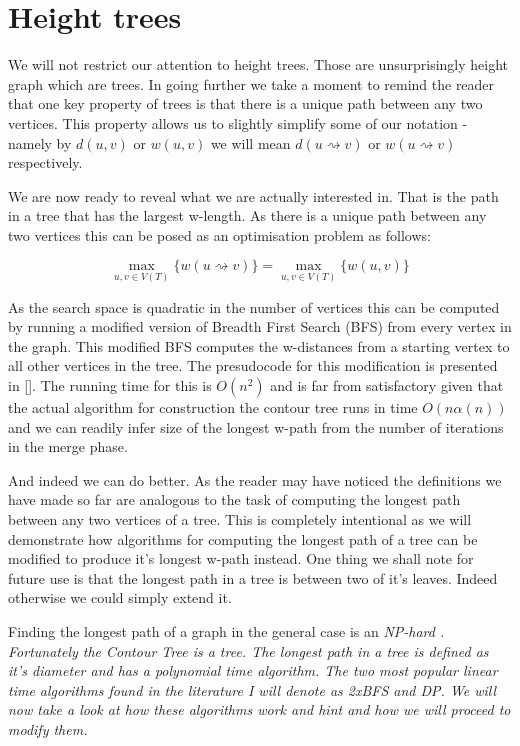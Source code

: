 \section{Height trees}

We will not restrict our attention to height trees. Those are unsurprisingly height graph which are trees. In going further we take a moment to remind the reader that one key property of trees is that there is a unique path between any two vertices. This property allows us to slightly simplify some of our notation - namely by $d(u, v)$ or $w(u, v)$ we will mean $d(u \rightsquigarrow v)$ or $w(u \rightsquigarrow v)$ respectively.  

We are now ready to reveal what we are actually interested in. That is the path in a tree that has the largest w-length. As there is a unique path between any two vertices this can be posed as an optimisation problem as follows:

$$ \max_{u, v \in V(T)}\{ w(u \rightsquigarrow v) \} =  \max_{u, v \in V(T)}\{ w(u, v) \} $$

As the search space is quadratic in the number of vertices this can be computed by running a modified version of Breadth First Search (BFS) from every vertex in the graph. This modified BFS computes the w-distances from a starting vertex to all other vertices in the tree. The presudocode for this modification is presented in []. The running time for this is $O(n^2)$ and is far from satisfactory given that the actual algorithm for construction the contour tree runs in time $O(n\alpha(n))$ and we can readily infer size of the longest w-path from the number of iterations in the merge phase.

And indeed we can do better. As the reader may have noticed the definitions we have made so far are analogous to the task of computing the longest path between any two vertices of a tree. This is completely intentional as we will demonstrate how algorithms for computing the longest path of a tree can be modified to produce it's longest w-path instead.  One thing we shall note for future use is that the longest path in a tree is between two of it's leaves. Indeed otherwise we could simply extend it.

Finding the longest path of a graph in the general case is an \em NP-hard \em. Fortunately the Contour Tree is a tree. The longest path in a tree is defined as it's diameter and has a polynomial time algorithm. The two most popular linear time algorithms found in the literature I will denote as 2xBFS and DP. We will now take a look at how these algorithms work and hint and how we will proceed to modify them.

